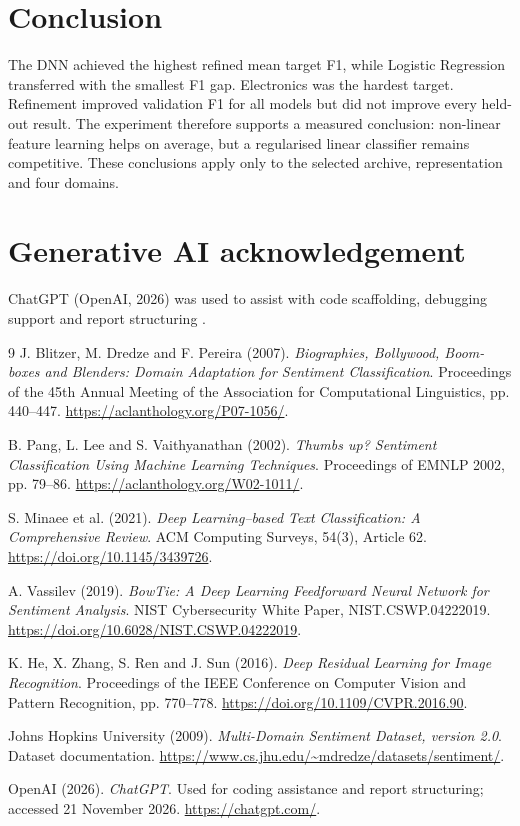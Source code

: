 \documentclass[11pt,a4paper]{article}
\begin{document}
\section{Conclusion}
The DNN achieved the highest refined mean target F1, while Logistic Regression transferred with the smallest F1 gap. Electronics was the hardest target. Refinement improved validation F1 for all models but did not improve every held-out result. The experiment therefore supports a measured conclusion: non-linear feature learning helps on average, but a regularised linear classifier remains competitive. These conclusions apply only to the selected archive, representation and four domains.

\section*{Generative AI acknowledgement}
ChatGPT (OpenAI, 2026) was used to assist with code scaffolding, debugging support and report structuring \cite{openai}.

\begin{thebibliography}{9}
\small
\setlength{\itemsep}{2pt}
\setlength{\parsep}{0pt}
J. Blitzer, M. Dredze and F. Pereira (2007). \emph{Biographies, Bollywood, Boom-boxes and Blenders: Domain Adaptation for Sentiment Classification}. Proceedings of the 45th Annual Meeting of the Association for Computational Linguistics, pp. 440--447. \url{https://aclanthology.org/P07-1056/}.

B. Pang, L. Lee and S. Vaithyanathan (2002). \emph{Thumbs up? Sentiment Classification Using Machine Learning Techniques}. Proceedings of EMNLP 2002, pp. 79--86. \url{https://aclanthology.org/W02-1011/}.

S. Minaee et al. (2021). \emph{Deep Learning--based Text Classification: A Comprehensive Review}. ACM Computing Surveys, 54(3), Article 62. \url{https://doi.org/10.1145/3439726}.

A. Vassilev (2019). \emph{BowTie: A Deep Learning Feedforward Neural Network for Sentiment Analysis}. NIST Cybersecurity White Paper, NIST.CSWP.04222019. \url{https://doi.org/10.6028/NIST.CSWP.04222019}.

K. He, X. Zhang, S. Ren and J. Sun (2016). \emph{Deep Residual Learning for Image Recognition}. Proceedings of the IEEE Conference on Computer Vision and Pattern Recognition, pp. 770--778. \url{https://doi.org/10.1109/CVPR.2016.90}.

Johns Hopkins University (2009). \emph{Multi-Domain Sentiment Dataset, version 2.0}. Dataset documentation. \url{https://www.cs.jhu.edu/~mdredze/datasets/sentiment/}.

OpenAI (2026). \emph{ChatGPT}. Used for coding assistance and report structuring; accessed 21 November 2026. \url{https://chatgpt.com/}.
\end{thebibliography}
\end{document}
